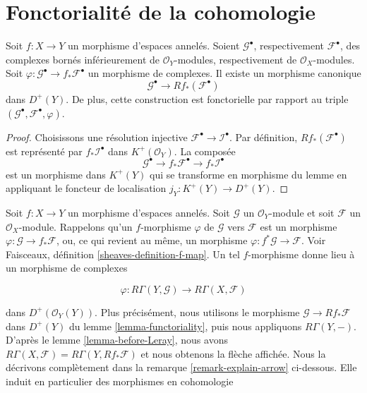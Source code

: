 \section{Fonctorialité de la cohomologie}

\label{section-functoriality}

\begin{lemma}

\label{lemma-functoriality}

Soit $f : X \to Y$ un morphisme d'espaces annelés. Soient $\mathcal{G}^\bullet$, respectivement $\mathcal{F}^\bullet$, des complexes bornés inférieurement de $\mathcal{O}_Y$-modules, respectivement de $\mathcal{O}_X$-modules.
Soit $\varphi : \mathcal{G}^\bullet \to f_*\mathcal{F}^\bullet$ un
morphisme de complexes. Il existe un morphisme canonique
$$
\mathcal{G}^\bullet
\longrightarrow
Rf_*(\mathcal{F}^\bullet)
$$
dans $D^{+}(Y)$. De plus, cette construction est fonctorielle par rapport au triple
$(\mathcal{G}^\bullet, \mathcal{F}^\bullet, \varphi)$.

\end{lemma}

\begin{proof}
Choisissons une résolution injective $\mathcal{F}^\bullet \to \mathcal{I}^\bullet$. Par définition, $Rf_*(\mathcal{F}^\bullet)$ est représenté par $f_*\mathcal{I}^\bullet$ dans $K^{+}(\mathcal{O}_Y)$. La composée $$
\mathcal{G}^\bullet \to f_*\mathcal{F}^\bullet \to f_*\mathcal{I}^\bullet
$$ est un morphisme dans $K^{+}(Y)$ qui se transforme en morphisme du lemme en appliquant le foncteur de localisation $j_Y : K^{+}(Y) \to D^{+}(Y)$.
\end{proof}

\noindent

Soit $f : X \to Y$ un morphisme d'espaces annelés. Soit $\mathcal{G}$ un $\mathcal{O}_Y$-module et soit
$\mathcal{F}$ un $\mathcal{O}_X$-module. Rappelons qu'un
$f$-morphisme $\varphi$ de $\mathcal{G}$ vers $\mathcal{F}$ est un morphisme
$\varphi : \mathcal{G} \to f_*\mathcal{F}$, ou, ce qui revient au même, un morphisme $\varphi : f^*\mathcal{G} \to \mathcal{F}$. Voir Faisceaux, définition \ref{sheaves-definition-f-map}. Un tel $f$-morphisme donne lieu à un morphisme de complexes

\begin{equation}
\label{equation-functorial-derived}
\varphi :
R\Gamma(Y, \mathcal{G})
\longrightarrow
R\Gamma(X, \mathcal{F})
\end{equation}

dans $D^{+}(\mathcal{O}_Y(Y))$. Plus précisément, nous utilisons le morphisme
$\mathcal{G} \to Rf_*\mathcal{F}$ dans $D^{+}(Y)$ du lemme \ref{lemma-functoriality}, puis nous appliquons $R\Gamma(Y, -)$. D'après le lemme \ref{lemma-before-Leray}, nous avons
$R\Gamma(X, \mathcal{F}) = R\Gamma(Y, Rf_*\mathcal{F})$
et nous obtenons la flèche affichée. Nous la décrivons complètement dans la remarque \ref{remark-explain-arrow} ci-dessous. Elle induit en particulier des morphismes en cohomologie

